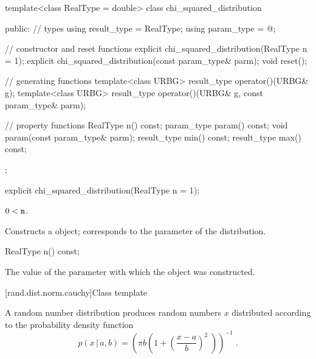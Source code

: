%
\begin{codeblock}
template<class RealType = double>
 class chi_squared_distribution
{
public:
 // types
 using result_type = RealType;
 using param_type  = @\unspec@;

 // constructor and reset functions
 explicit chi_squared_distribution(RealType n = 1);
 explicit chi_squared_distribution(const param_type& parm);
 void reset();

 // generating functions
 template<class URBG>
   result_type operator()(URBG& g);
 template<class URBG>
   result_type operator()(URBG& g, const param_type& parm);

 // property functions
 RealType n() const;
 param_type param() const;
 void param(const param_type& parm);
 result_type min() const;
 result_type max() const;
};
\end{codeblock}


%
\begin{itemdecl}
explicit chi_squared_distribution(RealType n = 1);
\end{itemdecl}

\begin{itemdescr}
\pnum\requires
 $ 0 < \texttt{n} $.

\pnum\effects Constructs a  object;
 corresponds to the parameter of the distribution.
\end{itemdescr}

%
\begin{itemdecl}
RealType n() const;
\end{itemdecl}

\begin{itemdescr}
\pnum\returns The value of the  parameter
 with which the object was constructed.
\end{itemdescr}


[rand.dist.norm.cauchy]{Class template }%
%
%

\pnum
A  random number distribution
produces random numbers $x$
distributed according to
the probability density function%
%
%
\[%
 p(x\,|\,a,b)
      = \left( \pi b \left( 1 + \left( \frac{x-a}{b}  \right)^2 \;\right)\right)^{-1}
\; \mbox{.}
\]

